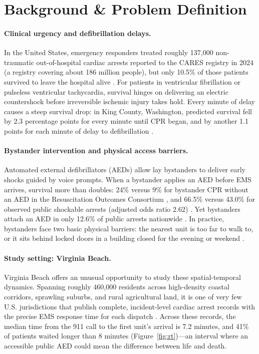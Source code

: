 \documentclass[11pt]{article}
\begin{document}
\section{Background \& Problem Definition}

\paragraph{Clinical urgency and defibrillation delays.} In the United States, emergency responders treated roughly 137{,}000 non-traumatic out-of-hospital cardiac arrests reported to the CARES registry in 2024 (a registry covering about 186 million people), but only 10.5\% of those patients survived to leave the hospital alive \cite{cares2024}. For patients in ventricular fibrillation or pulseless ventricular tachycardia, survival hinges on delivering an electric countershock before irreversible ischemic injury takes hold. Every minute of delay causes a steep survival drop: in King County, Washington, predicted survival fell by 2.3 percentage points for every minute until CPR began, and by another 1.1 points for each minute of delay to defibrillation \cite{larsen1993}.

\paragraph{Bystander intervention and physical access barriers.} Automated external defibrillators (AEDs) allow lay bystanders to deliver early shocks guided by voice prompts. When a bystander applies an AED before EMS arrives, survival more than doubles: 24\% versus 9\% for bystander CPR without an AED in the Resuscitation Outcomes Consortium \cite{weisfeldt2010}, and 66.5\% versus 43.0\% for observed public shockable arrests (adjusted odds ratio 2.62) \cite{pollack2018}. Yet bystanders attach an AED in only 12.6\% of public arrests nationwide \cite{cares2024}. In practice, bystanders face two basic physical barriers: the nearest unit is too far to walk to, or it sits behind locked doors in a building closed for the evening or weekend \cite{hansen2013,karlsson2019,deakin2018}.

\paragraph{Study setting: Virginia Beach.} Virginia Beach offers an unusual opportunity to study these spatial-temporal dynamics. Spanning roughly 460{,}000 residents across high-density coastal corridors, sprawling suburbs, and rural agricultural land, it is one of very few U.S. jurisdictions that publish complete, incident-level cardiac arrest records with the precise EMS response time for each dispatch \cite{custodio2022}. Across these records, the median time from the 911 call to the first unit's arrival is 7.2 minutes, and 41\% of patients waited longer than 8 minutes (Figure~\ref{fig:rt})---an interval where an accessible public AED could mean the difference between life and death.
\end{document}
